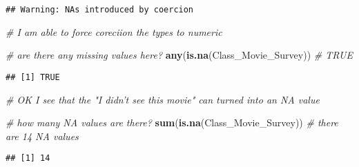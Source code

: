\documentclass[]{article}
\newenvironment{Shaded}{\begin{snugshade}}{\end{snugshade}}
\newcommand{\CommentTok}[1]{\textcolor[rgb]{0.56,0.35,0.01}{\textit{#1}}}
\newcommand{\KeywordTok}[1]{\textcolor[rgb]{0.13,0.29,0.53}{\textbf{#1}}}
\newcommand{\NormalTok}[1]{#1}
\begin{document}
\begin{verbatim}
## Warning: NAs introduced by coercion
\end{verbatim}

\begin{Shaded}
\begin{Highlighting}[]
\CommentTok{# I am able to force coreciion the types to numeric}

\CommentTok{# are there any missing values here?}
\KeywordTok{any}\NormalTok{(}\KeywordTok{is.na}\NormalTok{(Class_Movie_Survey)) }\CommentTok{# TRUE}
\end{Highlighting}
\end{Shaded}

\begin{verbatim}
## [1] TRUE
\end{verbatim}

\begin{Shaded}
\begin{Highlighting}[]
\CommentTok{# OK I see that the "I didn't see this movie" can turned into an NA value}

\CommentTok{# how many NA values are there?}
\KeywordTok{sum}\NormalTok{(}\KeywordTok{is.na}\NormalTok{(Class_Movie_Survey)) }\CommentTok{# there are 14 NA values}
\end{Highlighting}
\end{Shaded}

\begin{verbatim}
## [1] 14
\end{verbatim}
\end{document}
